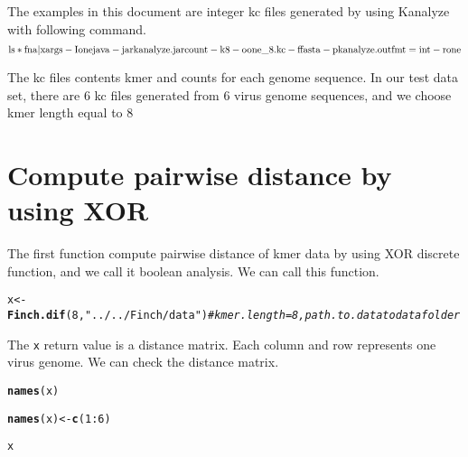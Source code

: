 \documentclass{article}\usepackage[]{graphicx}\usepackage[]{color}
\makeatletter
\newcommand{\hlnum}[1]{\textcolor[rgb]{0.686,0.059,0.569}{#1}}%
\newcommand{\hlstr}[1]{\textcolor[rgb]{0.192,0.494,0.8}{#1}}%
\newcommand{\hlcom}[1]{\textcolor[rgb]{0.678,0.584,0.686}{\textit{#1}}}%
\newcommand{\hlopt}[1]{\textcolor[rgb]{0,0,0}{#1}}%
\newcommand{\hlstd}[1]{\textcolor[rgb]{0.345,0.345,0.345}{#1}}%
\newcommand{\hlkwb}[1]{\textcolor[rgb]{0.69,0.353,0.396}{#1}}%
\newcommand{\hlkwd}[1]{\textcolor[rgb]{0.737,0.353,0.396}{\textbf{#1}}}%
\newenvironment{kframe}{%
 \def\at@end@of@kframe{}%
 \ifinner\ifhmode%
  \def\at@end@of@kframe{\end{minipage}}%
  \begin{minipage}{\columnwidth}%
 \fi\fi%
 \def\FrameCommand##1{\hskip\@totalleftmargin \hskip-\fboxsep
 \colorbox{shadecolor}{##1}\hskip-\fboxsep
     \hskip-\linewidth \hskip-\@totalleftmargin \hskip\columnwidth}%
 \MakeFramed {\advance\hsize-\width
   \@totalleftmargin\z@ \linewidth\hsize
   \@setminipage}}%
 {\par\unskip\endMakeFramed%
 \at@end@of@kframe}
\newenvironment{knitrout}{}{} %
\makeatother
\begin{document}
The examples in this document are integer kc files generated by using Kanalyze\cite{Audano:2014aa} with following command.
\[{\rm{ls *fna | xargs  - I one java  - jar kanalyze.jar count  - k 8  - o one\_8.kc  - f fasta  - p kanalyze.outfmt = int  - r one}}\]

The kc files contents kmer and counts for each genome sequence. In our test data set, there are 6 kc files generated from 6 virus genome sequences, and we choose kmer length equal to 8

\section{Compute pairwise distance by using XOR}
\label{Finch.dif}

The first function  compute pairwise distance of kmer data by using XOR discrete function, and we call it boolean analysis. We can call this function.

\begin{knitrout}
\color{fgcolor}\begin{kframe}
\begin{alltt}
\hlstd{x} \hlkwb{<-} \hlkwd{Finch.dif}\hlstd{(}\hlnum{8}\hlstd{,}\hlstr{"../../Finch/data"}\hlstd{)} \hlcom{#kmer.length = 8, path.to.data to data folder}
\end{alltt}


{\ttfamily\noindent\bfseries{}}\end{kframe}
\end{knitrout}

The \texttt{x} return value is a distance matrix. Each column and row represents one virus genome. We can check the distance matrix.

\begin{knitrout}
\color{fgcolor}\begin{kframe}
\begin{alltt}
\hlkwd{names}\hlstd{(x)}
\end{alltt}


{\ttfamily\noindent\bfseries\color{errorcolor}{\#\# Error in eval(expr, envir, enclos): object 'x' not found}}\begin{alltt}
\hlkwd{names}\hlstd{(x)} \hlkwb{<-} \hlkwd{c}\hlstd{(}\hlnum{1}\hlopt{:}\hlnum{6}\hlstd{)}
\end{alltt}


{\ttfamily\noindent\bfseries\color{errorcolor}{\#\# Error in names(x) <- c(1:6): object 'x' not found}}\begin{alltt}
\hlstd{x}
\end{alltt}


{\ttfamily\noindent\bfseries\color{errorcolor}{\#\# Error in eval(expr, envir, enclos): object 'x' not found}}\end{kframe}
\end{knitrout}
\end{document}

